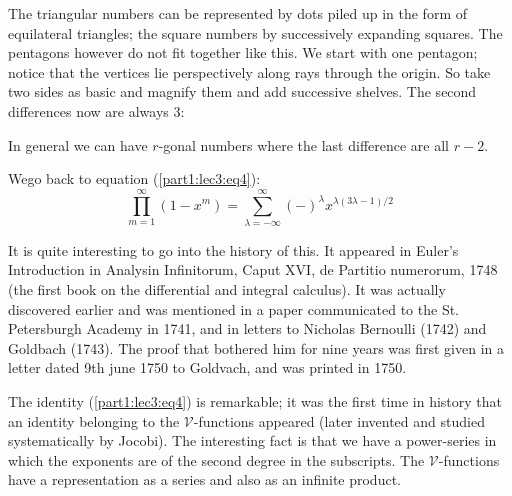 The triangular numbers can be represented by dots piled up in the form
of equilateral triangles; the square numbers by successively expanding
squares. The pentagons however do not fit together like this. We start
with one pentagon; notice that the vertices lie perspectively along
rays through the origin. So take two sides as basic and magnify them
and add successive shelves. The second differences now are always 3:

\begin{figure}[H]
\end{figure}

In general we can have $r$-gonal numbers where the last difference are
all $r-2$.

We\pageoriginale  go back to equation (\ref{part1:lec3:eq4}):
$$
\prod^\infty_{m=1} (1-x^m)= \sum\limits^\infty_{\lambda=-\infty}
(-)^\lambda x^{\lambda (3\lambda-1)/2} 
$$

It is quite interesting to go into the history of this. It appeared in
Euler's Introduction in Analysin Infinitorum, Caput XVI, de Partitio
numerorum, 1748 (the first book on the differential and integral
calculus). It was actually discovered earlier and was mentioned in a
paper communicated to the St. Petersburgh Academy in 1741, and in
letters to Nicholas Bernoulli (1742) and Goldbach (1743). The proof
that bothered him for nine years was first given in a letter dated 9th
june 1750 to Goldvach, and was printed in 1750.

The identity (\ref{part1:lec3:eq4}) is remarkable; it was the first time in history that
an identity belonging to the $\mathcal{V}$-functions appeared (later
invented and studied systematically by Jocobi). The interesting fact
is that we have a power-series in which the exponents are of the
second degree in the subscripts. The $\mathcal{V}$-functions have a
representation as a series and also as an infinite product.

